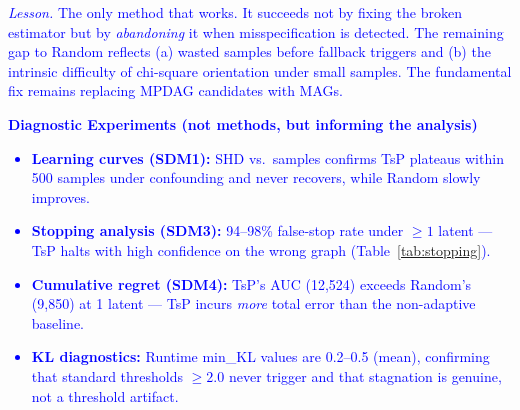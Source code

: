 \documentclass{article}
\begin{document}
\noindent\textcolor{blue}{\emph{Lesson.} The only method that works. It succeeds not by fixing the broken estimator but by \emph{abandoning} it when misspecification is detected. The remaining gap to Random reflects (a) wasted samples before fallback triggers and (b) the intrinsic difficulty of chi-square orientation under small samples. The fundamental fix remains replacing MPDAG candidates with MAGs.}

\bigskip

\noindent\textcolor{blue}{\textbf{Diagnostic Experiments (not methods, but informing the analysis)}}

\noindent\textcolor{blue}{\begin{itemize}
\item \textbf{Learning curves (SDM1):} SHD vs.\ samples confirms TsP plateaus within 500 samples under confounding and never recovers, while Random slowly improves.
\item \textbf{Stopping analysis (SDM3):} 94--98\% false-stop rate under $\geq 1$ latent — TsP halts with high confidence on the wrong graph (Table~\ref{tab:stopping}).
\item \textbf{Cumulative regret (SDM4):} TsP's AUC (12,524) exceeds Random's (9,850) at 1 latent — TsP incurs \emph{more} total error than the non-adaptive baseline.
\item \textbf{KL diagnostics:} Runtime min\_KL values are 0.2--0.5 (mean), confirming that standard thresholds $\geq 2.0$ never trigger and that stagnation is genuine, not a threshold artifact.
\end{itemize}}
\end{document}
